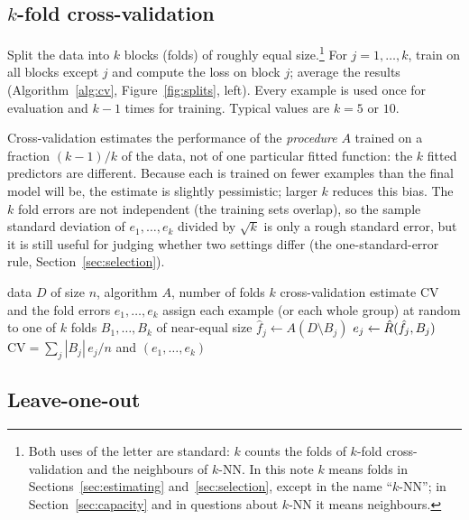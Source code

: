 \documentclass[11pt]{article}
\begin{document}
\subsection{\texorpdfstring{$k$}{k}-fold cross-validation}

Split the data into $k$ blocks (folds) of roughly equal size.\footnote{Both uses of the letter are standard: $k$ counts the folds of $k$-fold
cross-validation and the neighbours of $k$-NN. In this note $k$ means folds in Sections~\ref{sec:estimating}
and~\ref{sec:selection}, except in the name ``$k$-NN''; in Section~\ref{sec:capacity} and in questions about $k$-NN
it means neighbours.} For $j = 1, \dots, k$, train on all blocks except $j$
and compute the loss on block $j$; average the results (Algorithm~\ref{alg:cv}, Figure~\ref{fig:splits}, left). Every
example is used once for evaluation and $k - 1$ times for training. Typical values are $k = 5$ or $10$.

Cross-validation estimates the performance of the \emph{procedure} $A$ trained on a fraction $(k-1)/k$ of the data,
not of one particular fitted function: the $k$ fitted predictors are different. Because each is trained on fewer
examples than the final model will be, the estimate is slightly pessimistic; larger $k$ reduces this bias. The $k$
fold errors are not independent (the training sets overlap), so the sample standard deviation of
$e_1, \dots, e_k$ divided by $\sqrt k$ is only a rough standard error, but it is still useful for judging whether two settings differ (the one-standard-error rule, Section~\ref{sec:selection}).

\begin{algorithm}[htbp]\small
\caption{$k$-fold cross-validation}
\label{alg:cv}
\begin{algorithmic}[1]
\Require data $D$ of size $n$, algorithm $A$, number of folds $k$
\Ensure cross-validation estimate $\mathrm{CV}$ and the fold errors $e_1, \dots, e_k$
  \State assign each example (or each whole group) at random to one of $k$ folds $B_1, \dots, B_k$ of near-equal size
    \State $\hat f_j \gets A(D \setminus B_j)$ 
    \State $e_j \gets \hat R(\hat f_j, B_j)$ 
  \EndFor
  \State \Return $\mathrm{CV} = \sum_j |B_j|\, e_j / n$ and $(e_1, \dots, e_k)$
\EndFunction
\end{algorithmic}
\end{algorithm}

\subsection{Leave-one-out}
\end{document}
